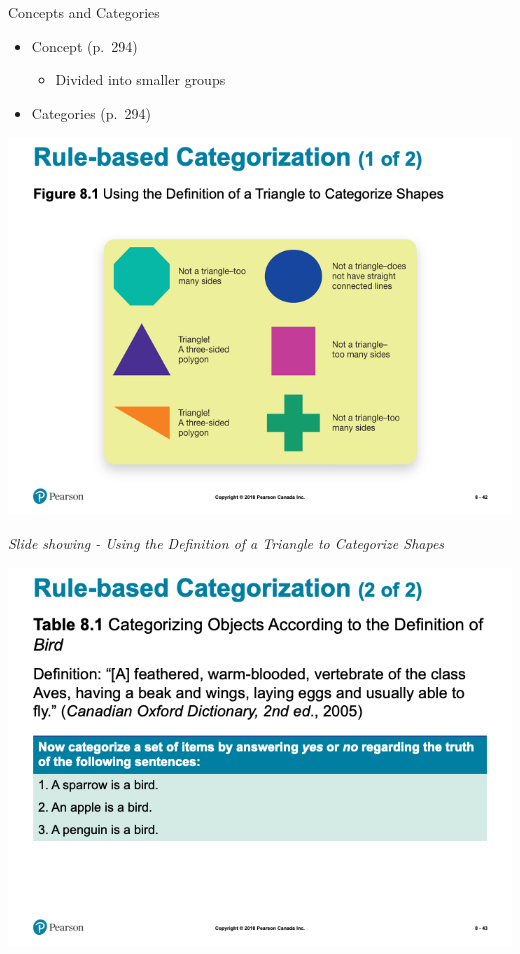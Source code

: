 \documentclass[
]{book}
\providecommand{\tightlist}{%
  \setlength{\itemsep}{0pt}\setlength{\parskip}{0pt}}
\begin{document}
\begin{reflect}
Concepts and Categories

\begin{itemize}
\tightlist
\item
  Concept (p.~294)

  \begin{itemize}
  \tightlist
  \item
    Divided into smaller groups\\
  \end{itemize}
\item
  Categories (p.~294)
\end{itemize}

\includegraphics{assets/unit_1/slide_42.png}

\emph{Slide showing - Using the Definition of a Triangle to Categorize Shapes}

\includegraphics{assets/unit_1/slide_43.png}


\end{reflect}
\end{document}
